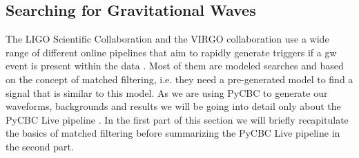 \subsection{Searching for Gravitational Waves}\label{sec:matched_filtering}
The LIGO Scientific Collaboration and the VIRGO collaboration use a wide range of different online pipelines that aim to rapidly generate triggers if a \gls{gw} event is present within the data \cite{ligo_pipelines}. Most of them are modeled searches and based on the concept of matched filtering, i.e. they need a pre-generated model to find a signal that is similar to this model. As we are using PyCBC to generate our waveforms, backgrounds and results we will be going into detail only about the PyCBC Live pipeline \cite{pycbc_live}. In the first part of this section we will briefly recapitulate the basics of matched filtering before summarizing the PyCBC Live pipeline in the second part.
